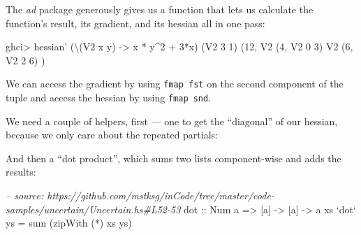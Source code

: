 \documentclass[]{article}
\newenvironment{Shaded}{}{}
\newcommand{\KeywordTok}[1]{\textcolor[rgb]{0.00,0.44,0.13}{\textbf{{#1}}}}
\newcommand{\DataTypeTok}[1]{\textcolor[rgb]{0.56,0.13,0.00}{{#1}}}
\newcommand{\DecValTok}[1]{\textcolor[rgb]{0.25,0.63,0.44}{{#1}}}
\newcommand{\CommentTok}[1]{\textcolor[rgb]{0.38,0.63,0.69}{\textit{{#1}}}}
\newcommand{\OtherTok}[1]{\textcolor[rgb]{0.00,0.44,0.13}{{#1}}}
\newcommand{\FunctionTok}[1]{\textcolor[rgb]{0.02,0.16,0.49}{{#1}}}
\newcommand{\NormalTok}[1]{{#1}}
\begin{document}
The \emph{ad} package generously gives us a function that lets us
calculate the function's result, its gradient, and its hessian all in
one pass:

\begin{Shaded}
\begin{Highlighting}[]
\NormalTok{ghci}\FunctionTok{>} \NormalTok{hessian' (\textbackslash{}(}\DataTypeTok{V2} \NormalTok{x y) }\OtherTok{->} \NormalTok{x }\FunctionTok{*} \NormalTok{y}\FunctionTok{^}\DecValTok{2} \FunctionTok{+} \DecValTok{3}\FunctionTok{*}\NormalTok{x) (}\DataTypeTok{V2} \DecValTok{3} \DecValTok{1}\NormalTok{)}
\NormalTok{(}\DecValTok{12}\NormalTok{, }\DataTypeTok{V2} \NormalTok{(}\DecValTok{4}\NormalTok{, }\DataTypeTok{V2} \DecValTok{0} \DecValTok{3}\NormalTok{)}
     \DataTypeTok{V2} \NormalTok{(}\DecValTok{6}\NormalTok{, }\DataTypeTok{V2} \DecValTok{2} \DecValTok{6}\NormalTok{)}
\NormalTok{)}
\end{Highlighting}
\end{Shaded}

We can access the gradient by using \texttt{fmap\ fst} on the second
component of the tuple and access the hessian by using
\texttt{fmap\ snd}.

We need a couple of helpers, first --- one to get the ``diagonal'' of
our hessian, because we only care about the repeated partials:

\begin{Shaded}
\end{Shaded}

And then a ``dot product'', which sums two lists component-wise and adds
the results:

\begin{Shaded}
\begin{Highlighting}[]
\CommentTok{-- source: https://github.com/mstksg/inCode/tree/master/code-samples/uncertain/Uncertain.hs#L52-53}
\OtherTok{dot ::} \DataTypeTok{Num} \NormalTok{a }\OtherTok{=>} \NormalTok{[a] }\OtherTok{->} \NormalTok{[a] }\OtherTok{->} \NormalTok{a}
\NormalTok{xs }\OtherTok{`dot`} \NormalTok{ys }\FunctionTok{=} \NormalTok{sum (zipWith (}\FunctionTok{*}\NormalTok{) xs ys)}
\end{Highlighting}
\end{Shaded}
\end{document}
